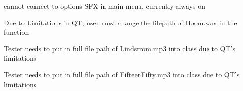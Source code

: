 
\begin{DoxyRefList}
\item[\label{bug__bug000001}%
\hypertarget{bug__bug000001}{}%
Member \hyperlink{class_bomb_a5752ce7daece5c3bf2e2178bcfcb820d}{Bomb\-:\-:explode} ()]cannot connect to options S\-F\-X in main menu, currently always on 

Due to Limitations in Q\-T, user must change the filepath of Boom.\-wav in the function  
\item[\label{bug__bug000002}%
\hypertarget{bug__bug000002}{}%
Member \hyperlink{class_game_screen_a61ac084a564d45be53337cc364214a60}{Game\-Screen\-:\-:Game\-Screen} (Q\-Widget $\ast$parent=0)]Tester needs to put in full file path of Lindstrom.\-mp3 into class due to Q\-T's limitations  
\item[\label{bug__bug000003}%
\hypertarget{bug__bug000003}{}%
Member \hyperlink{class_main_window_a8b244be8b7b7db1b08de2a2acb9409db}{Main\-Window\-:\-:Main\-Window} (Q\-Widget $\ast$parent=0)]Tester needs to put in full file path of Fifteen\-Fifty.\-mp3 into class due to Q\-T's limitations 
\end{DoxyRefList}